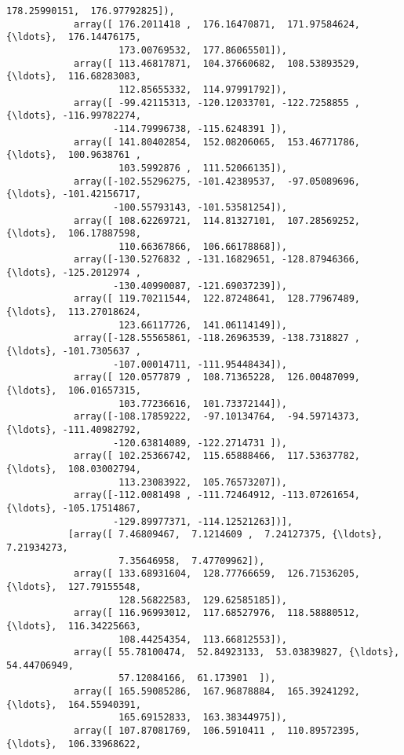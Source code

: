 \documentclass[11pt]{article}
\begin{document}
\begin{Verbatim}[commandchars=\\\{\}]
                    178.25990151,  176.97792825]),
            array([ 176.2011418 ,  176.16470871,  171.97584624, {\ldots},  176.14476175,
                    173.00769532,  177.86065501]),
            array([ 113.46817871,  104.37660682,  108.53893529, {\ldots},  116.68283083,
                    112.85655332,  114.97991792]),
            array([ -99.42115313, -120.12033701, -122.7258855 , {\ldots}, -116.99782274,
                   -114.79996738, -115.6248391 ]),
            array([ 141.80402854,  152.08206065,  153.46771786, {\ldots},  100.9638761 ,
                    103.5992876 ,  111.52066135]),
            array([-102.55296275, -101.42389537,  -97.05089696, {\ldots}, -101.42156717,
                   -100.55793143, -101.53581254]),
            array([ 108.62269721,  114.81327101,  107.28569252, {\ldots},  106.17887598,
                    110.66367866,  106.66178868]),
            array([-130.5276832 , -131.16829651, -128.87946366, {\ldots}, -125.2012974 ,
                   -130.40990087, -121.69037239]),
            array([ 119.70211544,  122.87248641,  128.77967489, {\ldots},  113.27018624,
                    123.66117726,  141.06114149]),
            array([-128.55565861, -118.26963539, -138.7318827 , {\ldots}, -101.7305637 ,
                   -107.00014711, -111.95448434]),
            array([ 120.0577879 ,  108.71365228,  126.00487099, {\ldots},  106.01657315,
                    103.77236616,  101.73372144]),
            array([-108.17859222,  -97.10134764,  -94.59714373, {\ldots}, -111.40982792,
                   -120.63814089, -122.2714731 ]),
            array([ 102.25366742,  115.65888466,  117.53637782, {\ldots},  108.03002794,
                    113.23083922,  105.76573207]),
            array([-112.0081498 , -111.72464912, -113.07261654, {\ldots}, -105.17514867,
                   -129.89977371, -114.12521263])],
           [array([ 7.46809467,  7.1214609 ,  7.24127375, {\ldots},  7.21934273,
                    7.35646958,  7.47709962]),
            array([ 133.68931604,  128.77766659,  126.71536205, {\ldots},  127.79155548,
                    128.56822583,  129.62585185]),
            array([ 116.96993012,  117.68527976,  118.58880512, {\ldots},  116.34225663,
                    108.44254354,  113.66812553]),
            array([ 55.78100474,  52.84923133,  53.03839827, {\ldots},  54.44706949,
                    57.12084166,  61.173901  ]),
            array([ 165.59085286,  167.96878884,  165.39241292, {\ldots},  164.55940391,
                    165.69152833,  163.38344975]),
            array([ 107.87081769,  106.5910411 ,  110.89572395, {\ldots},  106.33968622,

\end{Verbatim}
\end{document}

